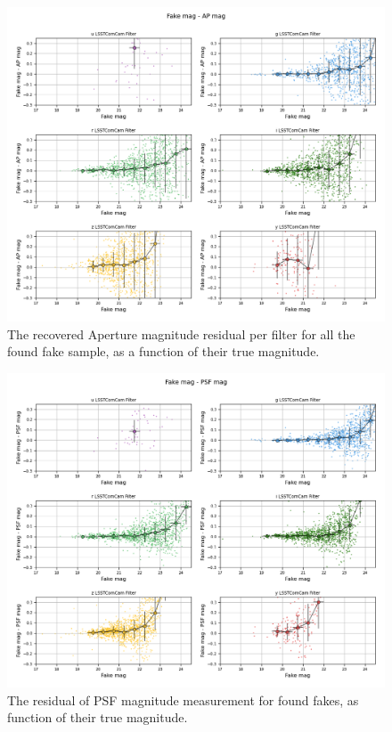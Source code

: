 \begin{figure}
    \centering
    \includegraphics[width=0.95\linewidth]{figures/scatter_mag_ap_mag_perfilter.png}
    \caption{The recovered Aperture magnitude residual per filter for all the found fake sample, as a function of their true magnitude. }
    \label{fig:photometric_recovery_vs_fakemag}
\end{figure}
\begin{figure}
    \centering
    \includegraphics[width=0.95\linewidth]{figures/scatter_mag_psf_mag_perfilter.png}
    \caption{The residual of PSF magnitude measurement for found fakes, as function of their true magnitude.}
    \label{fig:photometric_recovery_psf_vs_fakemag}
\end{figure}
